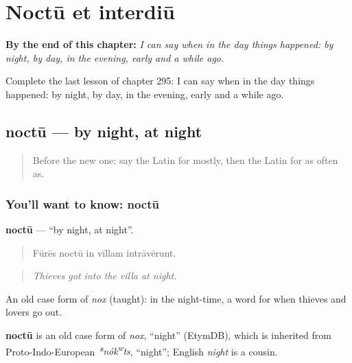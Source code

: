 
\chapter{Noctū et interdiū}
\label{ch:la-noctu-et-interdiu}

\begin{chapteropening}
\textbf{By the end of this chapter:} \emph{I can say when in the day things happened: by night, by day, in the evening, early and a while ago.}

Complete the last lesson of chapter 295: I can say when in the day things happened: by night, by day, in the evening, early and a while ago.
\end{chapteropening}

\section[noctū]{noctū — by night, at night}

\label{lesson:LA-C295-noctu}



\begin{quote}
Before the new one: say the Latin for mostly, then the Latin for as often as.
\end{quote}

\subsection*{You'll want to know: noctū}
\textbf{noctū} — \textquotedblleft{}by night, at night\textquotedblright{}.

\begin{quote}
Fūrēs noctū in vīllam intrāvērunt.
\end{quote}

\begin{quote}
\emph{Thieves got into the villa at night.}
\end{quote}

An old case form of \emph{nox} (taught): in the night-time, a word for when thieves and lovers go out.

\begin{cousinweb}
\textbf{noctū} is an old case form of \emph{nox}, \textquotedblleft{}night\textquotedblright{} (EtymDB), which is inherited from Proto-Indo-European \emph{*nók\textsuperscript{w}ts}, \textquotedblleft{}night\textquotedblright{}; English \emph{night} is a cousin.
\end{cousinweb}

